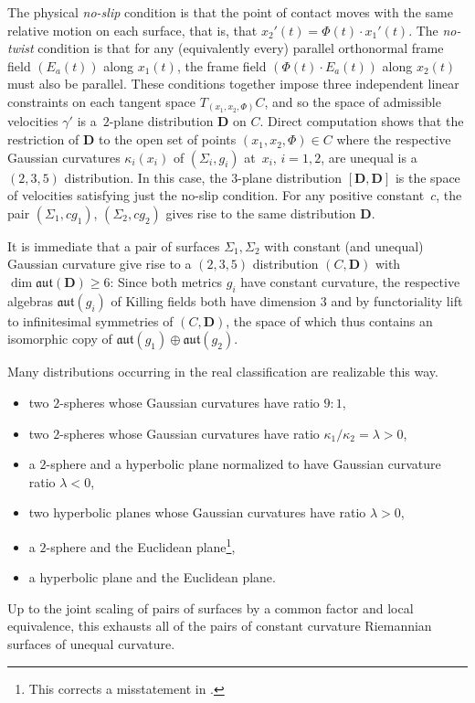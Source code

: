 \documentclass[pdftex]{sigma}
\newcommand{\bbR}{\mathbb{R}}
\newcommand{\mbD}{\mathbf{D}}
\newcommand{\mbO}{\mathbf{O}}
\newcommand{\mfaut}{\mathfrak{aut}}
\numberwithin{equation}{section}
\begin{document}
The physical \textit{no-slip} condition is that the point of contact moves with the same relative motion on each surface, that is, that $x_2'(t) = \Phi(t) \cdot x_1'(t)$. The \textit{no-twist} condition is that for any (equivalently every) parallel orthonormal frame field $(E_a(t))$ along $x_1(t)$, the frame field \mbox{$(\Phi(t) \cdot E_a(t))$} along $x_2(t)$ must also be parallel. These conditions together impose three independent linear constraints on each tangent space $T_{(x_1, x_2, \Phi)} C$, and so the space of admissible velocities $\gamma'$ is a~$2$-plane distribution $\mbD$ on $C$. Direct computation shows that the restriction of $\mbD$ to the open set of points $(x_1, x_2, \Phi) \in C$ where the respective Gaussian curvatures $\kappa_i({x_i})$ of $(\Sigma_i, g_i)$ at~$x_i$, $i = 1, 2$, are unequal is a $(2, 3, 5)$ distribution. In this case, the $3$-plane distribution $[\mbD, \mbD]$ is the space of velocities satisfying just the no-slip condition. For any positive constant~$c$, the pair $(\Sigma_1, c g_1)$, $(\Sigma_2, c g_2)$ gives rise to the same distribution $\mbD$.

It is immediate that a pair of surfaces $\Sigma_1, \Sigma_2$ with constant (and unequal) Gaussian curvature give rise to a $(2, 3, 5)$ distribution $(C, \mbD)$ with $\dim \mfaut(\mbD) \geq 6$: Since both metrics $g_i$ have constant curvature, the respective algebras $\mfaut(g_i)$ of Killing fields both have dimension $3$ and by functoriality lift to infinitesimal symmetries of $(C, \mbD)$, the space of which thus contains an isomorphic copy of $\mfaut(g_1) \oplus \mfaut(g_2)$.

Many distributions occurring in the real classification are realizable this way.
\begin{itemize}[leftmargin=1.5cm]\itemsep=0pt
	\item[$\mbO^{\bbR}$] two $2$-spheres whose Gaussian curvatures have ratio $9 : 1$,
	\item[$\mathbf{D.6}_{\lambda}^6$] two $2$-spheres whose Gaussian curvatures have ratio $\kappa_1 / \kappa_2 = \lambda > 0$,
	\item[$\mathbf{D.6}_{\lambda}^4$] a $2$-sphere and a hyperbolic plane normalized to have Gaussian curvature ratio $\lambda < 0$,
	\item[$\mathbf{D.6}_{\lambda}^{2+}$] two hyperbolic planes whose Gaussian curvatures have ratio $\lambda > 0$,
	\item[$\mathbf{D.6}_{\infty}^4$] a $2$-sphere and the Euclidean plane\footnote{This corrects a misstatement in \cite{WillseCounterexample}.},
	\item[$\mathbf{D.6}_{\infty}^{2}$] a hyperbolic plane and the Euclidean plane.
\end{itemize}
Up to the joint scaling of pairs of surfaces by a common factor and local equivalence, this exhausts all of the pairs of constant curvature Riemannian surfaces of unequal curvature.
\end{document}
